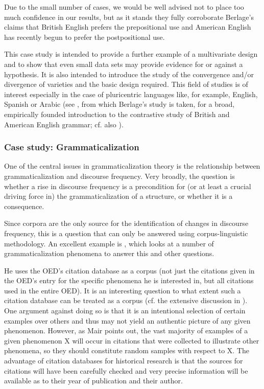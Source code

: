 Due to the small number of cases, we would be well advised not to place too much confidence in our results, but as it stands they fully corroborate Berlage's claims that British  English prefers the prepositional  use and American  English has recently begun to prefer the postpositional  use.

This case study is intended to provide a further example of a multivariate  design  and to show that even small data sets may provide evidence for or against a hypothesis. It is also intended to introduce the study of the convergence and\slash or divergence of varieties  and the basic design required. This field of studies is of interest especially in the case of pluricentric languages like, for example, English, Spanish or Arabic (see \citet{rohdenburg_one_2009}, from which Berlage's study is taken, for a broad, empirically founded introduction to the contrastive study of British  and American  English grammar; cf. also \citet{leech_recent_2006}).

\subsubsection{Case study: Grammaticalization}
\label{sec:grammaticalization}

One of the central issues in grammaticalization  theory is the relationship between grammaticalization and discourse frequency.  Very broadly, the question is whether a rise in discourse frequency is a precondition for (or at least a crucial driving force in) the grammaticalization of a structure, or whether it is a consequence.

Since corpora are the only source for the identification of changes in discourse frequency,  this is a question that can only be answered using corpus\hyp{}linguistic methodology. An excellent example is \citet{lindquist_corpus_2004-1}, which looks at a number of grammaticalization  phenomena to answer this and other questions.

He uses the OED's  citation database as a corpus (not just the citations given in the OED's entry for the specific phenomena he is interested in, but all citations used in the entire OED).  It is an interesting question to what extent such a citation database can be treated as a corpus (cf. the extensive discussion in \citealt{hoffmann_using_2004}). One argument against doing so is that it is an intentional selection of certain examples over others and thus may not yield an authentic  picture of any given phenomenon. However, as Mair points out, the vast majority of examples of a given phenomenon X will occur in citations that were collected to illustrate other phenomena, so they should constitute random samples with respect to X. The advantage of citation databases for historical research is that the sources for citations will have been carefully checked and very precise information will be available as to their year of publication and their author.


